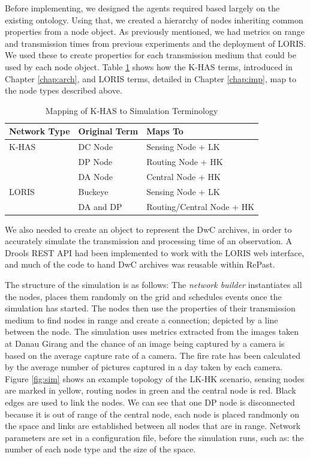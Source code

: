 Before implementing, we designed the agents required based largely on the existing ontology. Using that, we created a hierarchy of nodes inheriting common properties from a node object. As previously mentioned, we had metrics on range and transmission times from previous experiments and the deployment of LORIS. We used these to create properties for each transmission medium that could be used by each node object. Table \ref{sim:tab:terms} shows how the K-HAS terms, introduced in Chapter \ref{chap:arch}, and LORIS terms, detailed in Chapter \ref{chap:imp}, map to the node types described above. 

\begin{table}[h]
\centering
\begin{tabular}{|l|l|l|}
\hline
\textbf{Network Type} & \textbf{Original Term} & \textbf{Maps To}          \\
\hline
K-HAS                 & DC Node                & Sensing Node + LK         \\
                      & DP Node                & Routing Node + HK         \\
                      & DA Node                & Central Node + HK         \\
LORIS                 & Buckeye                & Sensing Node + LK         \\
                      & DA and DP              & Routing/Central Node + HK \\
\hline
\end{tabular}
\caption{Mapping of K-HAS to Simulation Terminology}
\label{sim:tab:terms}
\end{table}


We also needed to create an object to represent the DwC archives, in order to accurately simulate the transmission and processing time of an observation. A Drools REST API had been implemented to work with the LORIS web interface, and much of the code to hand DwC archives was reusable within RePast. 

The structure of the simulation is as follows: The \textit{network builder} instantiates all the nodes, places them randomly on the grid and schedules events once the simulation has started. The nodes then use the properties of their transmission medium to find nodes in range and create a connection; depicted by a line between the node. The simulation uses metrics extracted from the images taken at Danau Girang and the chance of an image being captured by a camera is based on the average capture rate of a camera. The fire rate has been calculated by the average number of pictures captured in a day taken by each camera. Figure \ref{fig:sim} shows an example topology of the LK-HK scenario, sensing nodes are marked in yellow, routing nodes in green and the central node is red. Black edges are used to link the nodes. We can see that one DP node is disconnected because it is out of range of the central node, each node is placed randmonly on the space and links are established between all nodes that are in range. Network parameters are set in a configuration file, before the simulation runs, such as: the number of each node type and the size of the space.


